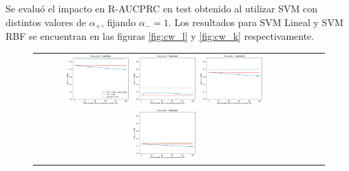 Se evaluó el impacto en R-AUCPRC en test obtenido al utilizar SVM con distintos valores de $\alpha_{+}$, fijando $\alpha_{-}=1$. Los resultados para SVM Lineal y SVM RBF se encuentran en las figuras \ref{fig:cw_l} y \ref{fig:cw_k} respectivamente. \\

\begin{figure}[h!]
\begin{tabular}{cccc}
  \includegraphics[width=0.25\textwidth]{Kap7/cw/train=b234_test=b261_linear_individual_curves.png}  \includegraphics[width=0.25\textwidth]{Kap7/cw/train=b234_test=b360_linear_individual_curves.png}
  \includegraphics[width=0.25\textwidth]{Kap7/cw/train=b261_test=b278_linear_individual_curves.png}  \includegraphics[width=0.25\textwidth]{Kap7/cw/train=b261_test=b360_linear_individual_curves.png} \\


\end{tabular}
\end{figure}

